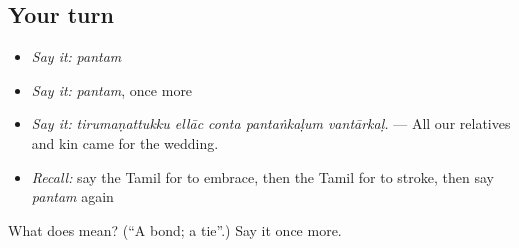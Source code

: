 \subsection*{Your turn}
\begin{itemize}
\raggedright
  \item \emph{Say it:} \emph{pantam}
  \item \emph{Say it:} \emph{pantam}, once more
  \item \emph{Say it:} \emph{tirumaṇattukku ellāc conta pantaṅkaḷum vantārkaḷ.} — All our relatives and kin came for the wedding.
  \item \emph{Recall:} say the Tamil for to embrace, then the Tamil for to stroke, then say \emph{pantam} again
\end{itemize}

\begin{tcolorbox}[breakable,colback=teal!4,colframe=teal!35!black,title={Before you move on}]
What does  mean? (\textquotedblleft{}A bond; a tie\textquotedblright{}.) Say it once more.
\end{tcolorbox}
